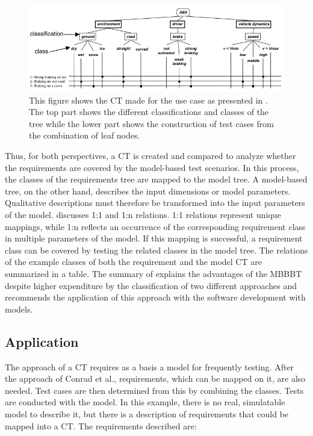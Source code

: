 \begin{figure}[H]
\centering
\includegraphics[scale=0.75]{../../individual/groeger/images/ClassificationTreeExample.png} 
\caption{This figure shows the CT made for the use case as presented in \cite{Conrad2005}. The top part shows the different classifications and classes of the tree while the lower part shows the construction of test cases from the combination of leaf nodes.}
\label{fig:ABS_CT}
\end{figure}

Thus, for both perspectives, a CT is created and compared to analyze whether the requirements are covered by the model-based test scenarios. In this process, the classes of the requirements tree are mapped to the model tree. A model-based tree, on the other hand, describes the input dimensions or model parameters. Qualitative descriptions must therefore be transformed into the input parameters of the model. \cite{Conrad2005} discusses 1:1 and 1:n relations. 1:1 relations represent unique mappings, while 1:n reflects an occurrence of the corresponding requirement class in multiple parameters of the model. If this mapping is successful, a requirement class can be covered by testing the related classes in the model tree. The relations of the example classes of both the requirement and the model CT are summarized in a table. The summary of \cite{Conrad2005} explains the advantages of the MBBBT despite higher expenditure by the classification of two different approaches and recommends the application of this approach with the software development with models.

\subsection{Application}

The approach of a CT requires as a basis a model for frequently testing. After the approach of Conrad et al.\cite{Conrad2005},  requirements, which can be mapped on it, are also needed. Test cases are then determined from this by combining the classes. Tests are conducted with the model. In this example, there is no real, simulatable model to describe it, but there is a description of requirements that could be mapped into a CT. The requirements described are:

